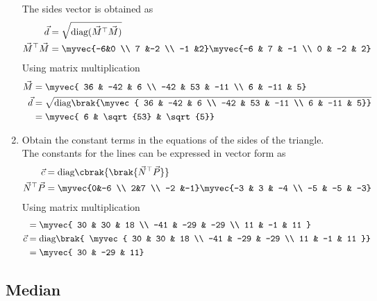 \documentclass[11pt]{book}
\begin{document}
\begin{enumerate}[label=\thesubsection.\arabic*.,ref=\thesubsection.\theenumi]
\solution The sides vector is obtained as
\begin{align}
\vec{d} &= \sqrt{\text{diag}(\vec{M}^{\top}\vec{M})}\\
\vec{M}^{\top}\vec{M} &= \myvec{-6&0 \\ 7 &-2 \\ -1 &2}\myvec{-6 & 7 & -1 \\ 0 & -2 & 2}
\end{align} 
Using matrix multiplication 
\begin{align}
    \vec{M} &= \myvec{ 36 & -42 & 6 \\ -42 & 53 & -11 \\ 6 & -11 & 5} \\
    \vec{d} &= \sqrt{\text{diag}\brak{\myvec{ 36 & -42 & 6 \\ -42 & 53 & -11 \\ 6 & -11 & 5}}} \\
    &= \myvec{ 6 & \sqrt{53} & \sqrt{5}}
\end{align}

\item Obtain the constant terms in the equations of the sides of the triangle. \\
\solution The constants for the lines can be expressed in vector form as
\begin{align}
\vec{c} &= \text{diag}\cbrak{\brak{\vec{N}^{\top}\vec{P}}}  \\
\vec{N}^{\top}\vec{P} &= \myvec{0&-6 \\ 2&7 \\ -2 &-1}\myvec{-3 & 3 & -4 \\ -5 & -5 & -3} \\
\end{align}
Using matrix multiplication
\begin{align}
    &=\myvec{ 30 & 30 & 18 \\ -41 & -29 & -29 \\ 11 & -1 & 11 } \\
    \vec{c} &= \text{diag}\brak{ \myvec{ 30 & 30 & 18 \\ -41 & -29 & -29 \\ 11 & -1 & 11 }} \\
    &= \myvec{ 30 & -29 & 11}
\end{align}
\end{enumerate}


\subsection{Median}
\end{document}

